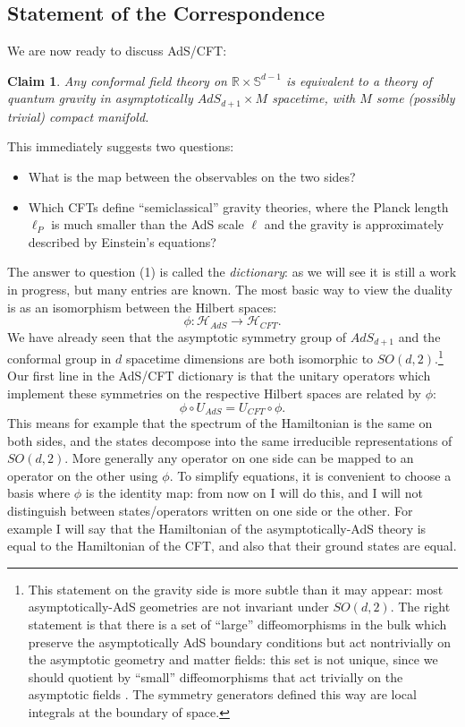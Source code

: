 \documentclass[toc]{PoS}
\newcommand{\be}{\begin{equation}}
\newcommand{\ee}{\end{equation}}
\newcommand{\bi}{\begin{itemize}}
\newcommand{\ei}{\end{itemize}}
\newtheorem{claim}{Claim}[section]
\begin{document}
\subsection{Statement of the Correspondence}
We are now ready to discuss AdS/CFT:
\begin{claim}
Any conformal field theory on $\mathbb{R}\times\mathbb{S}^{d-1}$ is equivalent to a theory of quantum gravity in asymptotically $AdS_{d+1}\times M$ spacetime, with $M$ some (possibly trivial) compact manifold.  
\end{claim}
This immediately suggests two questions:
\bi
\item[(1)] What is the map between the observables on the two sides?
\item[(2)] Which CFTs define ``semiclassical'' gravity theories, where the Planck length $\ell_P$ is much smaller than the AdS scale $\ell$ and the gravity is approximately described by Einstein's equations?
\ei
The answer to question (1) is called the \textit{dictionary}: as we will see it is still a work in progress, but many entries are known.  The most basic way to view the duality is as an isomorphism between the Hilbert spaces:
\be
\phi:\mathcal{H}_{AdS}\to \mathcal{H}_{CFT}.  
\ee
We have already seen that the asymptotic symmetry group of $AdS_{d+1}$ and the conformal group in $d$ spacetime dimensions are both isomorphic to $SO(d,2)$.\footnote{This statement on the gravity side is more subtle than it may appear: most asymptotically-AdS geometries are not invariant under $SO(d,2)$.  The right statement is that there is a set of ``large'' diffeomorphisms in the bulk which preserve the asymptotically AdS boundary conditions but act nontrivially on the asymptotic geometry and matter fields: this set is not unique, since we should quotient by ``small'' diffeomorphisms that act trivially on the asymptotic fields \cite{Henneaux:1985tv}.  The symmetry generators defined this way are local integrals at the boundary of space.}  Our first line in the AdS/CFT dictionary is that the unitary operators which implement these symmetries on the respective Hilbert spaces are related by $\phi$:
\be
\phi \circ U_{AdS}=U_{CFT}\circ \phi.
\ee
This means for example that the spectrum of the Hamiltonian is the same on both sides, and the states decompose into the same irreducible representations of $SO(d,2)$.  More generally any operator on one side can be mapped to an operator on the other using $\phi$.  To simplify equations, it is convenient to choose a basis where $\phi$ is the identity map: from now on I will do this, and I will not distinguish between states/operators written on one side or the other.  For example I will say that the Hamiltonian of the asymptotically-AdS theory is equal to the Hamiltonian of the CFT, and also that their ground states are equal.
\end{document}

